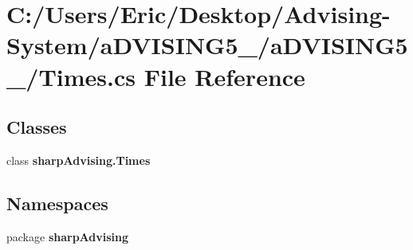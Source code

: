 \section{C\+:/\+Users/\+Eric/\+Desktop/\+Advising-\/\+System/a\+D\+V\+I\+S\+I\+N\+G5\+\_/a\+D\+V\+I\+S\+I\+N\+G5\+\_/\+Times.cs File Reference}
\label{_times_8cs}
\subsection*{Classes}
\begin{DoxyCompactItemize}
\item 
class {\bf sharp\+Advising.\+Times}
\end{DoxyCompactItemize}
\subsection*{Namespaces}
\begin{DoxyCompactItemize}
\item 
package {\bf sharp\+Advising}
\end{DoxyCompactItemize}
